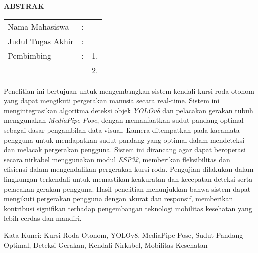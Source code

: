 \begin{center}
  \large\textbf{ABSTRAK}
\end{center}


\vspace{2ex}

\begingroup
\setlength{\tabcolsep}{0pt}

\noindent
\begin{tabularx}{\textwidth}{l >{\centering}m{2em} X}
  Nama Mahasiswa    & : & \name{}         \\

  Judul Tugas Akhir & : & \tatitle{}      \\

  Pembimbing        & : & 1. \advisor{}   \\
                    &   & 2. \coadvisor{} \\
\end{tabularx}
\endgroup

Penelitian ini bertujuan untuk mengembangkan sistem kendali kursi roda otonom yang dapat mengikuti pergerakan manusia secara real-time. Sistem ini mengintegrasikan algoritma deteksi objek \emph{YOLOv8} dan pelacakan gerakan tubuh menggunakan \emph{MediaPipe Pose}, dengan memanfaatkan sudut pandang optimal sebagai dasar pengambilan data visual. Kamera ditempatkan pada kacamata pengguna untuk mendapatkan sudut pandang yang optimal dalam mendeteksi dan melacak pergerakan pengguna. Sistem ini dirancang agar dapat beroperasi secara nirkabel menggunakan modul \emph{ESP32}, memberikan fleksibilitas dan efisiensi dalam mengendalikan pergerakan kursi roda. Pengujian dilakukan dalam lingkungan terkendali untuk memastikan keakuratan dan kecepatan deteksi serta pelacakan gerakan pengguna. Hasil penelitian menunjukkan bahwa sistem dapat mengikuti pergerakan pengguna dengan akurat dan responsif, memberikan kontribusi signifikan terhadap pengembangan teknologi mobilitas kesehatan yang lebih cerdas dan mandiri.

Kata Kunci: Kursi Roda Otonom, YOLOv8, MediaPipe Pose, Sudut Pandang Optimal, Deteksi Gerakan, Kendali Nirkabel, Mobilitas Kesehatan
